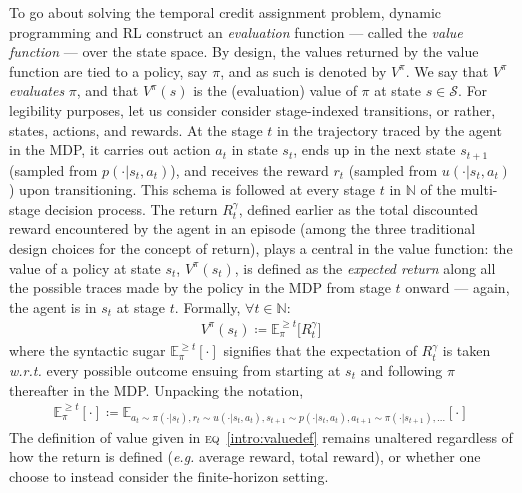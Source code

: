 To go about solving the temporal credit assignment problem,
dynamic programming and RL
construct an \emph{evaluation} function --- called the \emph{value function} --- over the state space.
By design, the values returned by the value function are tied to a policy, say $\pi$, and as such is denoted by
$V^\pi$. We say that $V^\pi$ \textit{evaluates} $\pi$,
and that $V^\pi(s)$ is the (evaluation) value of $\pi$ at state $s \in \mathcal{S}$.
For legibility purposes, let us consider consider stage-indexed transitions,
or rather, states, actions, and rewards.
At the stage $t$ in the trajectory traced by the agent in the MDP, it carries out action $a_t$ in state $s_t$,
ends up in the next state $s_{t+1}$ \big(sampled from $p(\cdot | s_t, a_t)$\big),
and receives the reward $r_t$ \big(sampled from $u(\cdot | s_t, a_t)$\big) upon transitioning.
This schema is followed at every stage $t$ in $\mathbb{N}$
of the multi-stage decision process.
The return $R_t^\gamma$, defined earlier as the total discounted reward encountered by the agent in an episode
(among the three traditional design choices for the concept of return),
plays a central in the value function:
the value of a policy at state $s_t$,
$V^\pi(s_t)$,
is defined as the \emph{expected return} along
all the possible traces made by the policy in the MDP from stage $t$ onward
--- again, the agent is in $s_t$ at stage $t$.
Formally, $\forall t \in \mathbb{N}$:
\begin{align}
V^\pi(s_t)
\coloneqq
\mathbb{E}_{\pi}^{\geq t} \big[R_t^\gamma\big]
\label{intro:valuedef}
\end{align}
where the syntactic sugar $\mathbb{E}_{\pi}^{\geq t} [\cdot]$ signifies that the expectation of $R_t^\gamma$ is taken
\textit{w.r.t.} every possible outcome ensuing from starting at $s_t$ and following $\pi$ thereafter
in the MDP. Unpacking the notation,
\begin{align}
\mathbb{E}_{\pi}^{\geq t} [\cdot]
\coloneqq
\mathbb{E}_{
a_t \sim \pi(\cdot|s_t),
r_t \sim u(\cdot|s_t,a_t),
s_{t+1} \sim p(\cdot|s_t,a_t),
a_{t+1} \sim \pi(\cdot|s_{t+1}),
\ldots} [\cdot]
\end{align}
The definition of value given in \textsc{eq}~\ref{intro:valuedef}
remains unaltered regardless of how the return is defined (\textit{e.g.} average reward, total reward),
or whether one choose to instead consider the finite-horizon setting.

